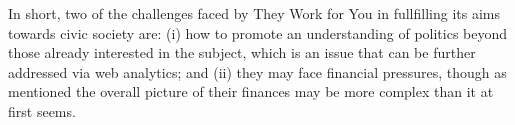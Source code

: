 In short, two of the challenges faced by They Work for You in fullfilling its aims towards civic society are: (i) how to promote an understanding of politics beyond those already interested in the subject, which is an issue that can be further addressed via web analytics; and (ii) they may face financial pressures, though as mentioned the overall picture of their finances may be more complex than it at first seems.